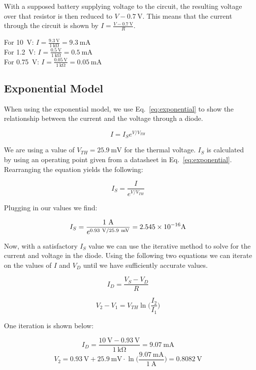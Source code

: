 \documentclass{../../ece-report}
\begin{document}
With a supposed battery supplying voltage to the circuit,
the resulting voltage over that resistor is then reduced
to $V - 0.7~\si{\V}$. This means that the current through the circuit
is shown by $I = \frac{V - 0.7~\si{\V}}{R}$.

For 10~V: $I=\frac{9.3~\si{\V}}{1~\si{\kohm}} = 9.3~\si{\mA}$ \\
For 1.2~V: $I=\frac{0.5~\si{\V}}{1~\si{\kohm}} = 0.5~\si{\mA}$ \\
For 0.75~V: $I=\frac{0.05~\si{\V}}{1~\si{\kohm}} = 0.05~\si{\mA}$

\subsection{Exponential Model}

When using the exponential model, we use Eq.~\ref{eq:exponential}
to show the relationship between the current and the
voltage through a diode.

\begin{equation}
  I = I_S e ^ {V / V_{TH}}
  \label{eq:exponential}
\end{equation}

We are using a value of $V_{TH}=25.9~\si{\mV}$ for the
thermal voltage. $I_S$ is calculated by using an operating
point given from a datasheet in Eq.~\ref{eq:exponential}.
Rearranging the equation yields the following:

\[
  I_S = \frac{I}{e^{V/V_{TH}}}
\]

Plugging in our values we find:

\[
  I_S = \frac{1~\si{\A}}{e^{0.93~\si{\V}/25.9~\si{\mV}}} = \SI{2.545E-16}~\si{\A}
\]

Now, with a satisfactory $I_S$ value we can use the
iterative method to solve for the current and voltage
in the diode. Using the following two equations we can
iterate on the values of $I$ and $V_D$ until we have
sufficiently accurate values.

\begin{equation}
  I_D = \frac{V_S - V_D}{R}
  \label{eq:I_D}
\end{equation}

\begin{equation}
  \label{eq:v1_v2}
  V_2 - V_1 = V_{TH} \ln \Big(\frac{I_2}{I_1}\Big)
\end{equation}

One iteration is shown below:

\[
  I_D = \frac{10~\si{\V} - 0.93~\si{\V}}{1~\si{\kohm}} = 9.07~\si{\mA}
\]
\[
  V_2 = 0.93~\si{\V} + 25.9~\si{\mV} \cdot \ln \Big( \frac{9.07~\si{\mA}}{1~\si{\A}} \Big) = 0.8082~\si{\V}
\]
\end{document}
